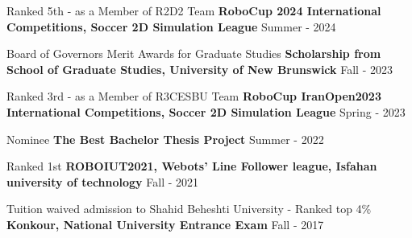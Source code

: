 \begin{cventries}
    
    \cventry
    {Ranked 5th - as a Member of R2D2 Team}
    {\textbf {RoboCup 2024 International Competitions, Soccer 2D Simulation League}}
    {}
    {Summer - 2024}
    {}
    
    
    \cventry
    {Board of Governors Merit Awards for Graduate Studies}
    {\textbf {Scholarship from School of Graduate Studies, University of New Brunswick}}
    {}
    {Fall - 2023}
    {}


    \cventry
    {Ranked 3rd - as a Member of R3CESBU Team}
    {\textbf {RoboCup IranOpen2023 International Competitions, Soccer 2D Simulation League}}
    {}
    {Spring - 2023}
    {}

    
    \cventry
    {Nominee}
    {\textbf {The Best Bachelor Thesis Project}}
    {}
    {Summer - 2022}
    {}

    
    \cventry
    {Ranked 1st}
    {\textbf {ROBOIUT2021, Webots’ Line Follower league, Isfahan university of technology}}
    {}
    {Fall - 2021}
    {}




    \cventry
    {Tuition waived admission to Shahid Beheshti University - Ranked top 4\%}
    {\textbf {Konkour, National University Entrance Exam}}
    {}
    {Fall - 2017}
    {}
\end{cventries}